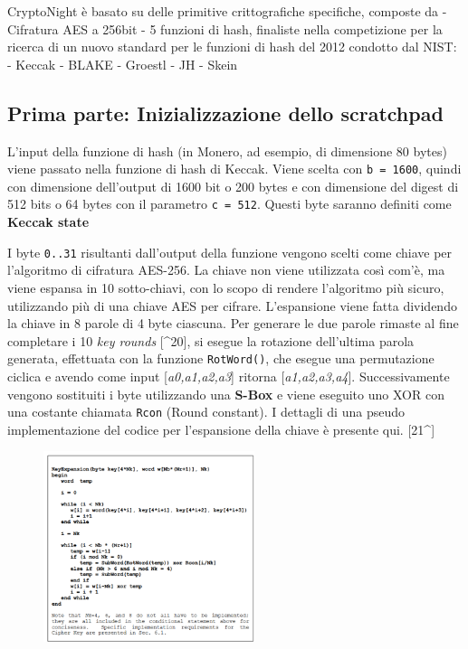 CryptoNight è basato su delle primitive crittografiche specifiche,
composte da - Cifratura AES a 256bit - 5 funzioni di hash, finaliste
nella competizione per la ricerca di un nuovo standard per le funzioni
di hash del 2012 condotto dal NIST: - Keccak - BLAKE - Groestl - JH -
Skein

\subsection{Prima parte: Inizializzazione dello
scratchpad}\label{prima-parte-inizializzazione-dello-scratchpad}

L'input della funzione di hash (in Monero, ad esempio, di dimensione 80
bytes) viene passato nella funzione di hash di Keccak. Viene scelta con
\texttt{b\ =\ 1600}, quindi con dimensione dell'output di 1600 bit o 200
bytes e con dimensione del digest di 512 bits o 64 bytes con il
parametro \texttt{c\ =\ 512}. Questi byte saranno definiti come
\textbf{Keccak state}

I byte \texttt{0..31} risultanti dall'output della funzione vengono
scelti come chiave per l'algoritmo di cifratura AES-256. La chiave non
viene utilizzata così com'è, ma viene espansa in 10 sotto-chiavi, con lo
scopo di rendere l'algoritmo più sicuro, utilizzando più di una chiave
AES per cifrare. L'espansione viene fatta dividendo la chiave in 8
parole di 4 byte ciascuna. Per generare le due parole rimaste al fine
completare i 10 \emph{key rounds} {[}\^{}20{]}, si esegue la rotazione
dell'ultima parola generata, effettuata con la funzione
\texttt{RotWord()}, che esegue una permutazione ciclica e avendo come
input {[}\emph{a0,a1,a2,a3}{]} ritorna {[}\emph{a1,a2,a3,a4}{]}.
Successivamente vengono sostituiti i byte utilizzando una \textbf{S-Box}
e viene eseguito uno XOR con una costante chiamata \texttt{Rcon} (Round
constant). I dettagli di una pseudo implementazione del codice per
l'espansione della chiave è presente qui. {[}21\^{}{]}

\begin{figure}[h]
  \centering
  \includegraphics[width = 0.55\textwidth]{image8.png}
\end{figure}


